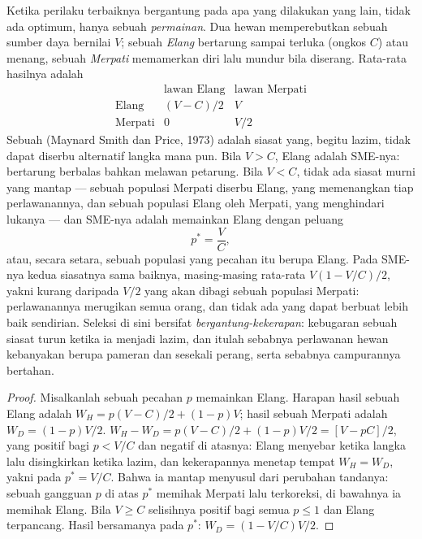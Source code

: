 \begin{proposition}\label{prop:b3:behavioural-ecology:hawk-dove}
%
Ketika perilaku terbaiknya bergantung pada apa yang dilakukan yang lain, tidak ada optimum,
hanya sebuah \emph{permainan}. Dua hewan memperebutkan sebuah sumber daya bernilai $V$; sebuah
\emph{Elang} bertarung sampai terluka (ongkos $C$) atau menang, sebuah \emph{Merpati}
memamerkan diri lalu mundur bila diserang. Rata-rata hasilnya adalah
\[
\begin{array}{c|cc}
 & \text{lawan Elang} & \text{lawan Merpati}\\ \hline
\text{Elang} & (V - C)/2 & V\\
\text{Merpati} & 0 & V/2
\end{array}
\]
Sebuah \emph{} (Maynard Smith dan Price, 1973)
adalah siasat yang, begitu lazim, tidak dapat diserbu alternatif langka mana pun.
Bila $V > C$, Elang adalah SME-nya: bertarung berbalas bahkan melawan petarung. Bila $V
< C$, tidak ada siasat murni yang mantap --- sebuah populasi Merpati
diserbu Elang, yang memenangkan tiap perlawanannya, dan sebuah populasi Elang oleh
Merpati, yang menghindari lukanya --- dan SME-nya adalah memainkan Elang dengan
peluang
\[
p^{*} = \frac{V}{C},
\]
atau, secara setara, sebuah populasi yang pecahan itu berupa Elang. Pada
SME-nya kedua siasatnya sama baiknya, masing-masing rata-rata $V(1 -
V/C)/2$, yakni kurang daripada $V/2$ yang akan dibagi sebuah populasi Merpati:
perlawanannya merugikan semua orang, dan tidak ada yang dapat berbuat lebih baik sendirian. Seleksi
di sini bersifat \emph{bergantung-kekerapan}: kebugaran sebuah siasat turun ketika ia
menjadi lazim, dan itulah sebabnya perlawanan hewan kebanyakan berupa pameran dan
sesekali perang, serta sebabnya campurannya bertahan.
\end{proposition}
\begin{proof}
Misalkanlah sebuah pecahan $p$ memainkan Elang. Harapan hasil sebuah Elang adalah $W_{H} = p(V
- C)/2 + (1 - p)V$; hasil sebuah Merpati adalah $W_{D} = (1 - p)V/2$. $W_{H} - W_{D} =
p(V - C)/2 + (1 - p)V/2 = [V - pC]/2$, yang positif bagi $p < V/C$ dan
negatif di atasnya: Elang menyebar ketika langka lalu disingkirkan ketika lazim, dan
kekerapannya menetap tempat $W_{H} = W_{D}$, yakni pada $p^{*} = V/C$. Bahwa ia
mantap menyusul dari perubahan tandanya: sebuah gangguan $p$ di atas
$p^{*}$ memihak Merpati lalu terkoreksi, di bawahnya ia memihak Elang. Bila $V
\ge C$ selisihnya positif bagi semua $p \le 1$ dan Elang terpancang.
Hasil bersamanya pada $p^{*}$: $W_{D} = (1 - V/C)V/2$.
\end{proof}

